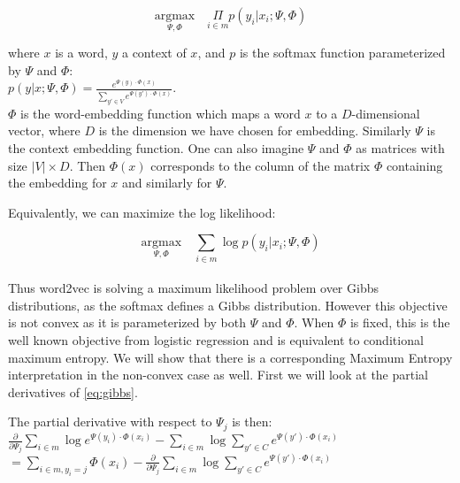 \documentclass[]{article}
\begin{document}
\begin{equation} \underset{\Psi,\Phi}{\text{argmax}} \quad \underset{i \in m}{\Pi}{p(y_i|x_i; \Psi, \Phi)}\label{eq:gibbs}\end{equation} 

\noindent where $x$ is a word, $y$ a context of $x$, and $p$ is the softmax function parameterized by $\Psi$ and $\Phi$:\\

$p(y|x; \Psi,\Phi) = \frac{e^{\Psi(y) \cdot \Phi(x)}}{\sum_{y\prime \in V}e^{\Psi(y\prime) \cdot \Phi(x)}}$.\\

$\Phi$ is the word-embedding function which maps a word $x$ to a $D$-dimensional vector, where $D$ is the dimension we have chosen for embedding. Similarly $\Psi$ is the context embedding function. One can also imagine $\Psi$ and $\Phi$ as matrices with size $|V| \times D$. Then $\Phi(x)$ corresponds to the column of the matrix $\Phi$ containing the embedding for $x$ and similarly for $\Psi$.

Equivalently, we can maximize the log likelihood:

\begin{equation} \underset{\Psi,\Phi}{\text{argmax}} \quad \underset{i \in m}{\sum}{\log p(y_i|x_i; \Psi, \Phi)}\label{eq:gibbs}\end{equation}\\

Thus word2vec is solving a maximum likelihood problem over Gibbs distributions, as the softmax defines a Gibbs distribution. However this objective is not convex as it is parameterized by both $\Psi$ and $\Phi$. When  $\Phi$ is fixed, this is the well known objective from logistic regression and is equivalent to conditional maximum entropy. We will show that there is a corresponding Maximum Entropy interpretation in the non-convex case as well. First we will look at the partial derivatives of \autoref{eq:gibbs}.

The partial derivative with respect to $\Psi_j$ is then:\\

$\frac{\partial}{\partial \Psi_j} \underset{i \in m}{\sum} \log e^{\Psi(y_i) \cdot \Phi(x_i)} - \underset{i \in m}{\sum} \log \sum_{y\prime \in C}e^{\Psi(y') \cdot \Phi(x_i)}$\\

$ = \underset{i \in m, y_i = j}{\sum} \Phi(x_i) - \frac{\partial}{\partial \Psi_j} \underset{i \in m}{\sum} \log \sum_{y\prime \in C}e^{\Psi(y') \cdot \Phi(x_i)}$\\
\end{document}
